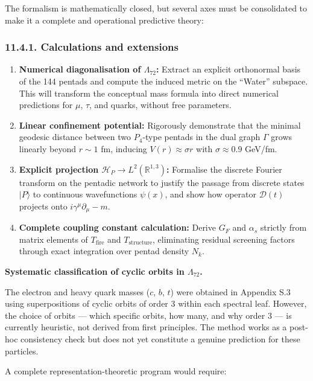 \documentclass[11pt]{article}
\let\oldmathcal\mathcal
\renewcommand{\mathcal}[1]{\oldmathcal{#1}}
\begin{document}
The formalism is mathematically closed, but several axes must be
consolidated to make it a complete and operational predictive theory:

\hypertarget{calculations-and-extensions}{%
\subsubsection{11.4.1. Calculations and
extensions}\label{calculations-and-extensions}}

\begin{enumerate}
    \item \textbf{Numerical diagonalisation of $\Lambda_{72}$:} Extract an explicit orthonormal basis of the 144 pentads and compute the induced metric on the ``Water'' subspace. This will transform the conceptual mass formula into direct numerical predictions for $\mu$, $\tau$, and quarks, without free parameters.
    \item \textbf{Linear confinement potential:} Rigorously demonstrate that the minimal geodesic distance between two $P_4$-type pentads in the dual graph $\Gamma$ grows linearly beyond $r \sim 1$ fm, inducing $V(r) \approx \sigma r$ with $\sigma \approx 0.9$ GeV/fm.
    \item \textbf{Explicit projection $\mathcal{H}_P \to L^2(\mathbb{R}^{1,3})$:} Formalise the discrete Fourier transform on the pentadic network to justify the passage from discrete states $|P\rangle$ to continuous wavefunctions $\psi(x)$, and show how operator $\mathcal{D}(t)$ projects onto $i\gamma^\mu\partial_\mu - m$.
    \item \textbf{Complete coupling constant calculation:} Derive $G_F$ and $\alpha_s$ strictly from matrix elements of $T_{\text{fire}}$ and $T_{\text{structure}}$, eliminating residual screening factors through exact integration over pentad density $N_k$.
\end{enumerate}

\textbf{Systematic classification of cyclic orbits in \(\Lambda_{72}\).}

The electron and heavy quark masses (\(c\), \(b\), \(t\)) were obtained
in Appendix S.3 using superpositions of cyclic orbits of order 3 within
each spectral leaf. However, the choice of orbits --- which specific
orbits, how many, and why order 3 --- is currently heuristic, not
derived from first principles. The method works as a post-hoc
consistency check but does not yet constitute a genuine prediction for
these particles.

A complete representation-theoretic program would require:
\end{document}
